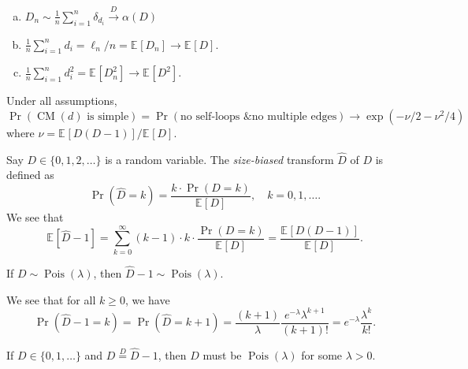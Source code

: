 \begin{prev}
	\begin{enumerate}[(a)]
		\item \(D_n \sim \frac{1}{n} \sum_{i=1}^{n} \delta _{d_i} \overset{D}{\to} \alpha (D)\)
		\item \(\frac{1}{n}\sum_{i=1}^{n} d_i = \ell _n / n = \mathbb{E}_{}[D_n] \to \mathbb{E}_{}[D] \).
		\item \(\frac{1}{n} \sum_{i=1}^{n} d_i^2 = \mathbb{E}_{}[D_n^2] \to \mathbb{E}_{}[D^2] \).
	\end{enumerate}
\end{prev}

Under all assumptions,
\[
	\Pr_{}\left(\operatorname{CM}(d) \text{ is simple} \right)
	= \Pr_{}\left(\text{no self-loops \& no multiple edges} \right)
	\to \exp (-\nu / 2 - \nu ^2 / 4)
\]
where \(\nu = \mathbb{E}_{}[D (D-1)] / \mathbb{E}_{}[D] \).

\begin{intuition}
	Say \(D \in \{ 0, 1, 2, \dots  \} \) is a random variable. The \emph{size-biased} transform \(\hat{D} \) of \(D\) is defined as
	\[
		\Pr_{}\left(\hat{D} = k\right)
		= \frac{k \cdot \Pr_{}\left(D = k\right) }{\mathbb{E}_{}[D] },\quad k = 0, 1, \dots.
	\]
	We see that
	\[
		\mathbb{E}_{}[\hat{D} - 1 ]
		= \sum_{k=0}^{\infty} (k-1) \cdot k \cdot \frac{\Pr_{}\left(D = k\right) }{\mathbb{E}_{}[D] }
		= \frac{\mathbb{E}_{}[D (D-1)] }{\mathbb{E}_{}[D] }.
	\]
\end{intuition}

\begin{remark}
	If \(D \sim \operatorname{Pois}(\lambda ) \), then \(\hat{D} - 1 \sim \operatorname{Pois}(\lambda ) \).
\end{remark}
\begin{explanation}
	We see that for all \(k \geq 0 \), we have
	\[
		\Pr_{}\left(\hat{D} - 1 = k\right)
		= \Pr_{}\left(\hat{D} = k + 1\right)
		= \frac{(k+1)}{\lambda } \frac{e^{-\lambda }\lambda ^{k+1}}{(k+1)!}
		= e^{-\lambda } \frac{\lambda ^k}{k!}.
	\]
\end{explanation}

\begin{exercise}
	If \(D \in \{ 0, 1, \dots  \} \) and \(D \overset{D}{=} \hat{D} - 1\), then \(D\) must be \(\operatorname{Pois}(\lambda ) \) for some \(\lambda > 0\).
\end{exercise}

